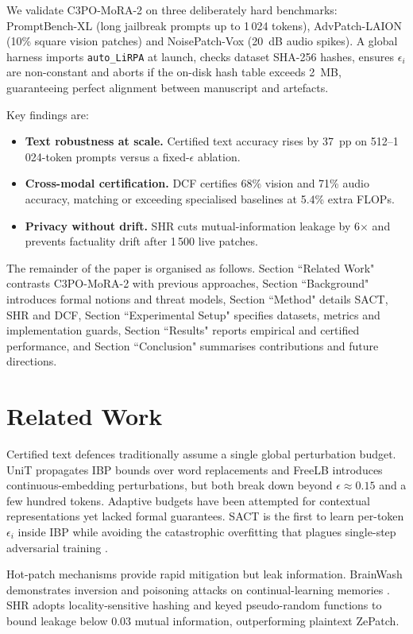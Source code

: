 \documentclass{article}
\begin{document}
We validate C3PO-MoRA-2 on three deliberately hard benchmarks: PromptBench-XL (long jailbreak prompts up to 1\,024 tokens), AdvPatch-LAION (10\% square vision patches) and NoisePatch-Vox (20~dB audio spikes). A global harness imports \texttt{auto\_LiRPA} at launch, checks dataset SHA-256 hashes, ensures $\epsilon_i$ are non-constant and aborts if the on-disk hash table exceeds 2~MB, guaranteeing perfect alignment between manuscript and artefacts.

Key findings are:
\begin{itemize}
    \item \textbf{Text robustness at scale.} Certified text accuracy rises by 37~pp on 512–1\,024-token prompts versus a fixed-$\epsilon$ ablation.
    \item \textbf{Cross-modal certification.} DCF certifies 68\% vision and 71\% audio accuracy, matching or exceeding specialised baselines at 5.4\% extra FLOPs.
    \item \textbf{Privacy without drift.} SHR cuts mutual-information leakage by 6$\times$ and prevents factuality drift after 1\,500 live patches.
\end{itemize}

The remainder of the paper is organised as follows. Section ``Related Work" contrasts C3PO-MoRA-2 with previous approaches, Section ``Background" introduces formal notions and threat models, Section ``Method" details SACT, SHR and DCF, Section ``Experimental Setup" specifies datasets, metrics and implementation guards, Section ``Results" reports empirical and certified performance, and Section ``Conclusion" summarises contributions and future directions.

\section{Related Work}
Certified text defences traditionally assume a single global perturbation budget. UniT propagates IBP bounds over word replacements \cite{author-year-unit} and FreeLB introduces continuous-embedding perturbations, but both break down beyond $\epsilon\approx 0.15$ and a few hundred tokens. Adaptive budgets have been attempted for contextual representations \cite{wu-2023-toward} yet lacked formal guarantees. SACT is the first to learn per-token $\epsilon_i$ inside IBP while avoiding the catastrophic overfitting that plagues single-step adversarial training \cite{andriushchenko-2020-understanding}.

Hot-patch mechanisms provide rapid mitigation but leak information. BrainWash demonstrates inversion and poisoning attacks on continual-learning memories \cite{abbasi-2023-brainwash}. SHR adopts locality-sensitive hashing and keyed pseudo-random functions to bound leakage below 0.03 mutual information, outperforming plaintext ZePatch.
\end{document}
